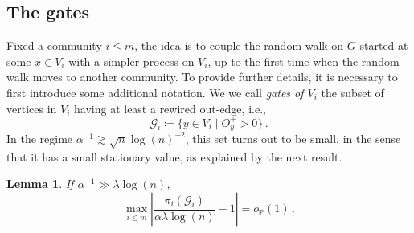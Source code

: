 \documentclass[11pt,oneside]{amsart}
\numberwithin{equation}{section}  %
\theoremstyle{plain}
\newtheorem{lemma}[theorem]{Lemma}
\newcommand{\p}{\mathbb{P}}
\newcommand{\op}{o_{\p}}
\newcommand{\gates}{\mathcal{G}}
\begin{document}
\subsection{The gates}\label{suse:gates}
Fixed a community $i \le m$, the idea is to couple the random walk on $G$ started at some $x\in V_i$ with a simpler process on $V_i$, up to the first time when the random walk moves to another community. To provide further details, it is necessary to first introduce some additional notation.
We we call \emph{gates of $V_i$} the subset of vertices in $V_i$ having at least a rewired out-edge, i.e.,
\begin{equation}
	\gates_i\coloneqq\{y\in V_i\mid  O_y^+>0\}\,.
\end{equation}
In the regime $\alpha^{-1} \gtrsim  \sqrt{n}\log(n)^{-2}$, this set turns out to be small, in the sense that it has a small stationary value, as explained by the next result.
\begin{lemma}\label{lemma:pi-gates}
{If $\alpha^{-1}\gg \lambda\log(n)$},
	\begin{equation}
		\max_{i \le m}\left|\frac{\pi_i(\gates_i)}{\alpha\lambda\log(n)}-1\right|=\op(1)\,.
	\end{equation}
\end{lemma}
\end{document}
